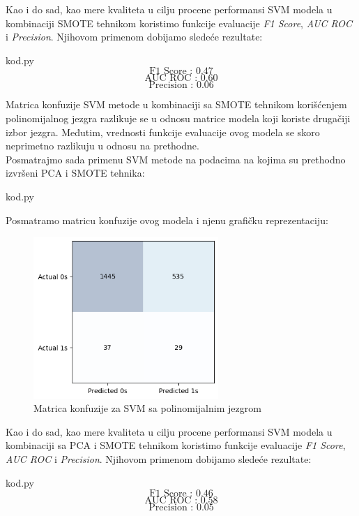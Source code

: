 \documentclass[12pt]{article}
\theoremstyle{definition}
\theoremstyle{remark}
\begin{document}
Kao i do sad, kao mere kvaliteta u cilju procene performansi SVM modela u kombinaciji SMOTE tehnikom koristimo funkcije evaluacije  \emph{F1 Score}, \emph{AUC ROC} i \emph{Precision}. Njihovom primenom dobijamo sledeće rezultate:

\hfill

{kod.py}
$$
\text{F1 Score : 0.47}
$$
$$
\text{AUC ROC : 0.60}
$$
$$
\text{Precision : 0.06}
$$

\hfill

Matrica konfuzije SVM metode u kombinaciji sa SMOTE tehnikom korišćenjem polinomijalnog jezgra razlikuje se u odnosu matrice modela koji koriste drugačiji izbor jezgra. Međutim, vrednosti funkcije evaluacije ovog modela se skoro neprimetno razlikuju u odnosu na prethodne.\\

Posmatrajmo sada primenu SVM metode na podacima na kojima su prethodno izvršeni PCA i SMOTE tehnika:

\hfill

{kod.py}

\hfill

Posmatramo matricu konfuzije ovog modela i njenu grafičku reprezentaciju:

\begin{figure}[htp]
    \centering
    \includegraphics[width=7cm]{output_89_0.png}
    \caption{Matrica konfuzije za SVM sa polinomijalnim jezgrom}
    \label{fig:galaxy}
\end{figure}

Kao i do sad, kao mere kvaliteta u cilju procene performansi SVM modela u kombinaciji sa PCA i SMOTE tehnikom koristimo funkcije evaluacije  \emph{F1 Score}, \emph{AUC ROC} i \emph{Precision}. Njihovom primenom dobijamo sledeće rezultate:

\hfill

{kod.py}
$$
\text{F1 Score : 0.46}
$$
$$
\text{AUC ROC : 0.58}
$$
$$
\text{Precision : 0.05}
$$
\end{document}
